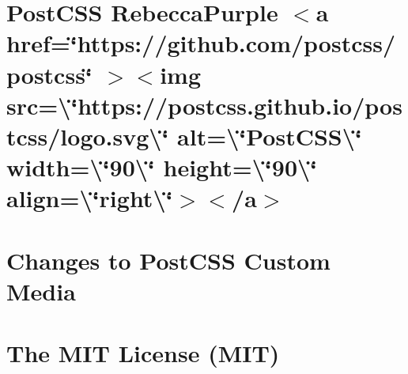 \documentclass[twoside]{book}
\newcommand{\+}{\discretionary{\mbox{\scriptsize$\hookleftarrow$}}{}{}}
\begin{document}
\chapter{Post\+CSS Rebecca\+Purple \texorpdfstring{$<$}{<}a href=\char`\"{}https\+://github.\+com/postcss/postcss\char`\"{} \texorpdfstring{$>$}{>}\texorpdfstring{$<$}{<}img src=\textbackslash{}\char`\"{}https\+://postcss.\+github.\+io/postcss/logo.\+svg\textbackslash{}\char`\"{} alt=\textbackslash{}\char`\"{}\+Post\+CSS\textbackslash{}\char`\"{} width=\textbackslash{}\char`\"{}90\textbackslash{}\char`\"{} height=\textbackslash{}\char`\"{}90\textbackslash{}\char`\"{} align=\textbackslash{}\char`\"{}right\textbackslash{}\char`\"{}\texorpdfstring{$>$}{>}\texorpdfstring{$<$}{<}/a\texorpdfstring{$>$}{>}}
\label{md__c___users_vaishnavi_jadhav__desktop__developer_code_mean_stack_example_client_node_modules_p57425176fbdff20028f00ed4ec07b947}

\chapter{Changes to Post\+CSS Custom Media}
\label{md__c___users_vaishnavi_jadhav__desktop__developer_code_mean_stack_example_client_node_modules_pd4a7f8b2b331cc01cb150365dc11d5de}

\chapter{The MIT License (MIT)}
\label{md__c___users_vaishnavi_jadhav__desktop__developer_code_mean_stack_example_client_node_modules_p11ec0f3e62ce97f8590cd5df1fc1cc30}

\end{document}
